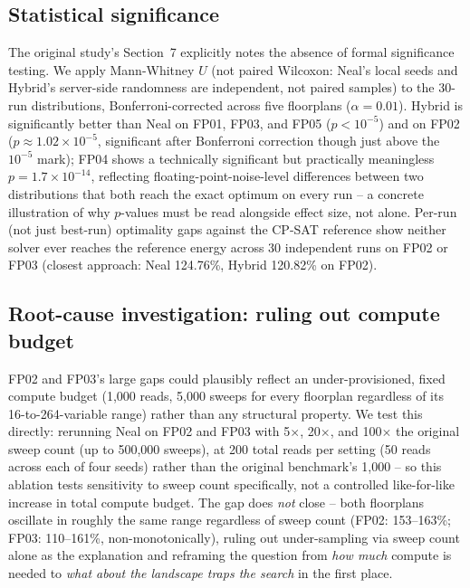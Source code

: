 \documentclass[11pt]{article}
\begin{document}
\subsection{Statistical significance}
\label{sec:significance}
The original study's Section~7 explicitly notes the absence of formal significance testing. We apply Mann-Whitney $U$ (not paired Wilcoxon: Neal's local seeds and Hybrid's server-side randomness are independent, not paired samples) to the 30-run distributions, Bonferroni-corrected across five floorplans ($\alpha=0.01$). Hybrid is significantly better than Neal on FP01, FP03, and FP05 ($p<10^{-5}$) and on FP02 ($p\approx1.02\times10^{-5}$, significant after Bonferroni correction though just above the $10^{-5}$ mark); FP04 shows a technically significant but practically meaningless $p=1.7\times10^{-14}$, reflecting floating-point-noise-level differences between two distributions that both reach the exact optimum on every run -- a concrete illustration of why $p$-values must be read alongside effect size, not alone. Per-run (not just best-run) optimality gaps against the CP-SAT reference show neither solver ever reaches the reference energy across 30 independent runs on FP02 or FP03 (closest approach: Neal 124.76\%, Hybrid 120.82\% on FP02).

\subsection{Root-cause investigation: ruling out compute budget}
\label{sec:budget}
FP02 and FP03's large gaps could plausibly reflect an under-provisioned, fixed compute budget (1,000 reads, 5,000 sweeps for every floorplan regardless of its 16-to-264-variable range) rather than any structural property. We test this directly: rerunning Neal on FP02 and FP03 with 5$\times$, 20$\times$, and 100$\times$ the original sweep count (up to 500,000 sweeps), at 200 total reads per setting (50 reads across each of four seeds) rather than the original benchmark's 1,000 -- so this ablation tests sensitivity to sweep count specifically, not a controlled like-for-like increase in total compute budget. The gap does \emph{not} close -- both floorplans oscillate in roughly the same range regardless of sweep count (FP02: 153--163\%; FP03: 110--161\%, non-monotonically), ruling out under-sampling via sweep count alone as the explanation and reframing the question from \emph{how much} compute is needed to \emph{what about the landscape traps the search} in the first place.
\end{document}
